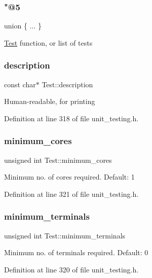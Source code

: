 \subsubsection{\texorpdfstring{"@5}{@5}}
{\footnotesize\ttfamily union \{ ... \} }

\hyperlink{structTest}{Test} function, or list of tests \mbox{\label{structTest_a294ca3f1114240c908f66216afcad783}} 
\subsubsection{\texorpdfstring{description}{description}}
{\footnotesize\ttfamily const char$\ast$ Test\+::description}

Human-\/readable, for printing 

Definition at line 318 of file unit\+\_\+testing.\+h.

\mbox{\label{structTest_ac203918837b4c6718a020246e189a95a}} 
\subsubsection{\texorpdfstring{minimum\+\_\+cores}{minimum\_cores}}
{\footnotesize\ttfamily unsigned int Test\+::minimum\+\_\+cores}

Minimum no. of cores required. Default\+: 1 

Definition at line 321 of file unit\+\_\+testing.\+h.

\mbox{\label{structTest_a2741188633c51b8e3cb545fa3971bf60}} 
\subsubsection{\texorpdfstring{minimum\+\_\+terminals}{minimum\_terminals}}
{\footnotesize\ttfamily unsigned int Test\+::minimum\+\_\+terminals}

Minimum no. of terminals required. Default\+: 0 

Definition at line 320 of file unit\+\_\+testing.\+h.

\mbox{\label{structTest_ae44674e48b203d9c26e04e09b6fe5b61}} 
